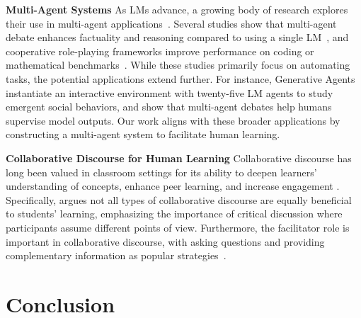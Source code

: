\documentclass[11pt]{article}
\begin{document}
\noindent
\textbf{Multi-Agent Systems}\quad
As LMs advance, a growing body of research explores their use in multi-agent applications~\citep{wu2023autogen,BabyAGI,liu2023dynamic,wang2024unleashing}. Several studies show that multi-agent debate enhances factuality and reasoning compared to using a single LM~\citep{du2023improving,liang2023encouraging}, and cooperative role-playing frameworks improve performance on coding or mathematical benchmarks~\citep{NEURIPS2023_a3621ee9,hong2023metagpt}. While these studies primarily focus on automating tasks, the potential applications extend further. For instance, Generative Agents~\citep{Park2023GenerativeAgents} instantiate an interactive environment with twenty-five LM agents to study emergent social behaviors, and \citet{michael2023debate} show that multi-agent debates help humans supervise model outputs. Our work aligns with these broader applications by constructing a multi-agent system to facilitate human learning.

\noindent
\textbf{Collaborative Discourse for Human Learning}\quad
Collaborative discourse has long been valued in classroom settings for its ability to deepen learners' understanding of concepts, enhance peer learning, and increase engagement %
\citep{nussbaum2008collaborative,osborne2010arguing,kolodner2007roles,chinn2000structure}. Specifically, \citet{nussbaum2008collaborative} argues not all types of collaborative discourse are equally beneficial to students' learning, emphasizing the importance of critical discussion where participants assume different points of view. Furthermore, the facilitator role is important in collaborative discourse, with asking questions and providing complementary information as popular strategies~\citep{onrubia2022assisting}.



\section{Conclusion}
\end{document}
